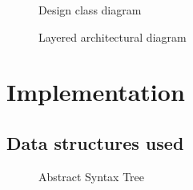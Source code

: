\documentclass[11pt,a4paper]{article}
\begin{document}
\begin{figure}[h!]
  \caption{Design class diagram}
  \label{fig:designclass}
\end{figure}

\begin{figure}[h!]
  \caption{Layered architectural diagram}
  \label{fig:layeredarchitecture}
\end{figure}



\section{Implementation}

\subsection{Data structures used}

\begin{figure}[h!]
  \caption{Abstract Syntax Tree}
  \label{fig:abstractsyntaxtree}
\end{figure}
\end{document}
